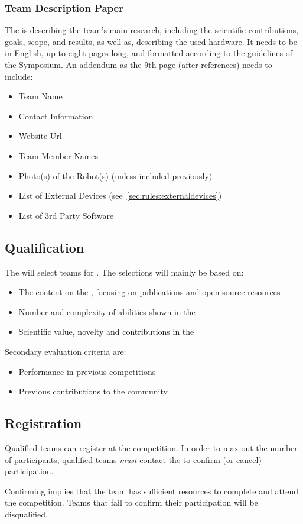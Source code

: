 \subsubsection{Team Description Paper}
\label{sec:rules:application:tdp}
The \TDP{} is describing the team's main research, including the scientific contributions, goals, scope, and results, as well as, describing the used hardware. It needs to be in English, up to eight pages long, and formatted according to the guidelines of the \RoboCup{} Symposium. 
An addendum as the 9th page (after references) needs to include:
\begin{itemize}
	\item Team Name
	\item Contact Information
	\item Website Url
	\item Team Member Names
	\item Photo(s) of the Robot(s) (unless included previously) 
	\item List of External Devices (see~\ref{sec:rules:externaldevices})
	\item List of 3rd Party Software
\end{itemize}


\subsection{Qualification}
\label{sec:rules:qualification}
The \OC{} will select teams for \Qualification{}. The selections will mainly be based on:
\begin{itemize}
	\item The content on the \TeamWebsite{}, focusing on publications and open source resources
	\item Number and complexity of abilities shown in the \TeamVideo{}
	\item Scientific value, novelty and contributions in the \TDP{}

\end{itemize}
Secondary evaluation criteria are:
\begin{itemize}
	\item Performance in previous competitions
	\item Previous contributions to the \AtHome{} community
\end{itemize}


\subsection{Registration}
\label{sec:rules:registration}
Qualified teams can register at the \RoboCup\AtHome{} competition. In order to max out the number of participants, qualified teams \emph{must} contact the \OC{} to confirm (or cancel) participation.

Confirming implies that the team has sufficient resources to complete \Registration{} and attend the competition. Teams that fail to confirm their participation will be disqualified.
